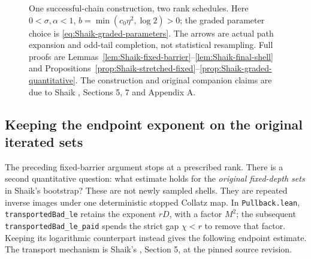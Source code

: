 \begin{figure}[ht]
\centering
{}
\caption{One successful-chain construction, two rank schedules.
Here \(0<\sigma,\alpha<1\), \(b=\min(c_0\eta^2,\log2)>0\);
the graded parameter choice is \eqref{eq:Shaik-graded-parameters}.
The arrows are actual path expansion and odd-tail completion, not
statistical resampling. Full proofs are
Lemmas~\ref{lem:Shaik-fixed-barrier}--\ref{lem:Shaik-final-shell} and
Propositions~\ref{prop:Shaik-stretched-fixed}--\ref{prop:Shaik-graded-quantitative}.
The construction and original companion claims are due to Shaik
\cite{Shaik2026v324}, Sections 5, 7 and Appendix A.}
\end{figure}

\subsection{Keeping the endpoint exponent on the original iterated sets}

The preceding fixed-barrier argument stops at a prescribed rank.
There is a second quantitative question: what estimate holds for the
\emph{original fixed-depth sets} in Shaik's bootstrap?
These are not newly sampled shells. They are repeated inverse images
under one deterministic stopped Collatz map.
In \texttt{Pullback.lean}, \texttt{transportedBad\_le} retains the
exponent \(rD\), with a factor \(M^2\); the subsequent
\texttt{transportedBad\_le\_paid} spends the strict gap \(\chi<r\)
to remove that factor. Keeping its logarithmic counterpart instead
gives the following endpoint estimate. The transport mechanism is
Shaik's \cite{Shaik2026v324}, Section 5, at the pinned source revision.

